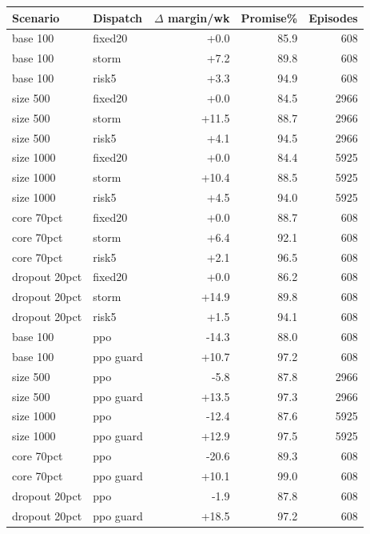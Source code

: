 \begin{tabular}{llrrr}
\toprule
Scenario & Dispatch & $\Delta$ margin/wk & Promise\% & Episodes \\
\midrule
base 100 & fixed20 & +0.0 & 85.9 & 608 \\
base 100 & storm & +7.2 & 89.8 & 608 \\
base 100 & risk5 & +3.3 & 94.9 & 608 \\
size 500 & fixed20 & +0.0 & 84.5 & 2966 \\
size 500 & storm & +11.5 & 88.7 & 2966 \\
size 500 & risk5 & +4.1 & 94.5 & 2966 \\
size 1000 & fixed20 & +0.0 & 84.4 & 5925 \\
size 1000 & storm & +10.4 & 88.5 & 5925 \\
size 1000 & risk5 & +4.5 & 94.0 & 5925 \\
core 70pct & fixed20 & +0.0 & 88.7 & 608 \\
core 70pct & storm & +6.4 & 92.1 & 608 \\
core 70pct & risk5 & +2.1 & 96.5 & 608 \\
dropout 20pct & fixed20 & +0.0 & 86.2 & 608 \\
dropout 20pct & storm & +14.9 & 89.8 & 608 \\
dropout 20pct & risk5 & +1.5 & 94.1 & 608 \\
base 100 & ppo & -14.3 & 88.0 & 608 \\
base 100 & ppo guard & +10.7 & 97.2 & 608 \\
size 500 & ppo & -5.8 & 87.8 & 2966 \\
size 500 & ppo guard & +13.5 & 97.3 & 2966 \\
size 1000 & ppo & -12.4 & 87.6 & 5925 \\
size 1000 & ppo guard & +12.9 & 97.5 & 5925 \\
core 70pct & ppo & -20.6 & 89.3 & 608 \\
core 70pct & ppo guard & +10.1 & 99.0 & 608 \\
dropout 20pct & ppo & -1.9 & 87.8 & 608 \\
dropout 20pct & ppo guard & +18.5 & 97.2 & 608 \\
\bottomrule
\end{tabular}
